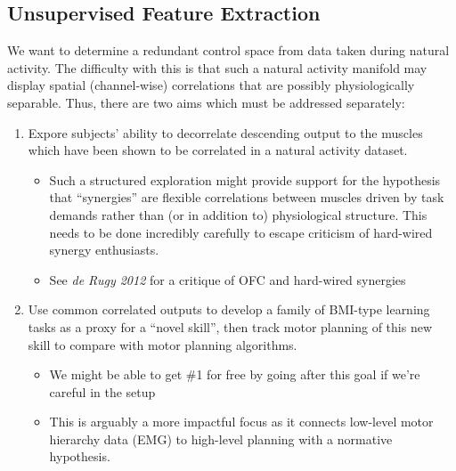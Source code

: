 {            \hypertarget{unsupervised-feature-extraction}{%
            \subsection{Unsupervised Feature
            Extraction}\label{unsupervised-feature-extraction}}

            We want to determine a redundant control space from data
            taken during natural activity. The difficulty with this is
            that such a natural activity manifold may display spatial
            (channel-wise) correlations that are possibly
            physiologically separable. Thus, there are two aims which
            must be addressed separately:

            \begin{enumerate}
            \def\labelenumi{\arabic{enumi}.}
            \tightlist
            \item
              Expore subjects' ability to decorrelate descending output
              to the muscles which have been shown to be correlated in a
              natural activity dataset.

              \begin{itemize}
              \tightlist
              \item
                Such a structured exploration might provide support for
                the hypothesis that ``synergies'' are flexible
                correlations between muscles driven by task demands
                rather than (or in addition to) physiological structure.
                This needs to be done incredibly carefully to escape
                criticism of hard-wired synergy enthusiasts.
              \item
                See \emph{de Rugy 2012} for a critique of OFC and
                hard-wired synergies
              \end{itemize}
            \item
              Use common correlated outputs to develop a family of
              BMI-type learning tasks as a proxy for a ``novel skill'',
              then track motor planning of this new skill to compare
              with motor planning algorithms.

              \begin{itemize}
              \tightlist
              \item
                We might be able to get \#1 for free by going after this
                goal if we're careful in the setup
              \item
                This is arguably a more impactful focus as it connects
                low-level motor hierarchy data (EMG) to high-level
                planning with a normative hypothesis.
              \end{itemize}
            \end{enumerate}

}
